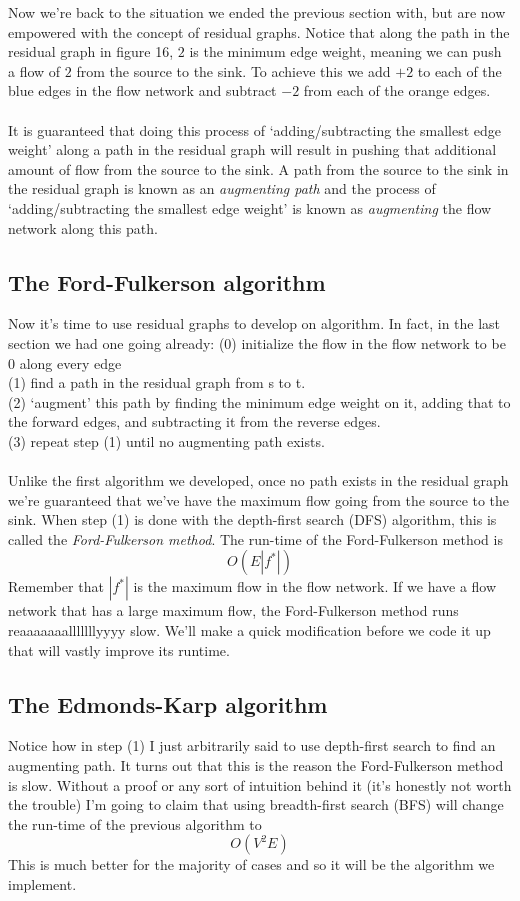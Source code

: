 \documentclass[11pt]{article}
\theoremstyle{plain}
\theoremstyle{definition}
\begin{document}
Now we're back to the situation we ended the previous section with, but are now empowered with the concept of residual graphs. Notice that along the path in the residual graph in figure 16, $2$ is the minimum edge weight, meaning we can push a flow of $2$ from the source to the sink. To achieve this we add $+2$ to each of the blue edges in the flow network and subtract $-2$ from each of the orange edges.
\\\\
It is guaranteed that doing this process of `adding/subtracting the smallest edge weight' along a path in the residual graph will result in pushing that additional amount of flow from the source to the sink. A path from the source to the sink in the residual graph is known as an \emph{augmenting path} and the process of `adding/subtracting the smallest edge weight' is known as \emph{augmenting} the flow network along this path.
\subsection{The Ford-Fulkerson algorithm}
Now it's time to use residual graphs to develop on algorithm. In fact, in the last section we had one going already:
\newpage
\noindent (0) initialize the flow in the flow network to be 0 along every edge \\
(1) find a path in the residual graph from s to t. \\
(2) `augment' this path by finding the minimum edge weight on it, adding that to the forward edges, and subtracting it from the reverse edges. \\
(3) repeat step (1) until no augmenting path exists. \\\\
Unlike the first algorithm we developed, once no path exists in the residual graph we're guaranteed that we've have the maximum flow going from the source to the sink. When step (1) is done with the depth-first search (DFS) algorithm, this is called the \emph{Ford-Fulkerson method}. The run-time of the Ford-Fulkerson method is $$\boxed{O(E |f^*|)}$$
Remember that $|f^*|$ is the maximum flow in the flow network. If we have a flow network that has a large maximum flow, the Ford-Fulkerson method runs reaaaaaaalllllllyyyy slow. We'll make a quick modification before we code it up that will vastly improve its runtime.
\subsection{The Edmonds-Karp algorithm}
Notice how in step (1) I just arbitrarily said to use depth-first search to find an augmenting path. It turns out that this is the reason the Ford-Fulkerson method is slow. Without a proof or any sort of intuition behind it (it's honestly not worth the trouble) I'm going to claim that using breadth-first search (BFS) will change the run-time of the previous algorithm to $$\boxed{O(V^2E)}$$
This is much better for the majority of cases and so it will be the algorithm we implement.
\end{document}
